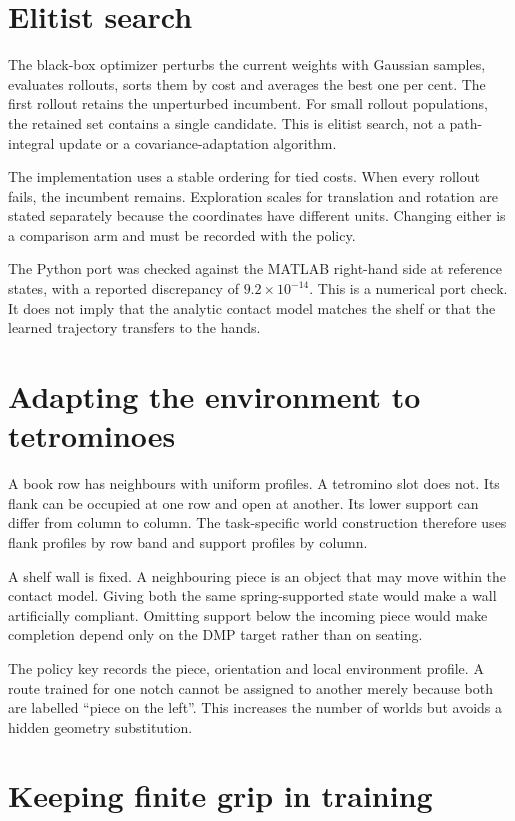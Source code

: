 \section{Elitist search}

The black-box optimizer perturbs the current weights with Gaussian samples, evaluates rollouts, sorts them by cost and averages the best one per cent. The first rollout retains the unperturbed incumbent. For small rollout populations, the retained set contains a single candidate. This is elitist search, not a path-integral update or a covariance-adaptation algorithm.

The implementation uses a stable ordering for tied costs. When every rollout fails, the incumbent remains. Exploration scales for translation and rotation are stated separately because the coordinates have different units. Changing either is a comparison arm and must be recorded with the policy.

The Python port was checked against the MATLAB right-hand side at reference states, with a reported discrepancy of $9.2\times10^{-14}$. This is a numerical port check. It does not imply that the analytic contact model matches the shelf or that the learned trajectory transfers to the hands.

\section{Adapting the environment to tetrominoes}

A book row has neighbours with uniform profiles. A tetromino slot does not. Its flank can be occupied at one row and open at another. Its lower support can differ from column to column. The task-specific world construction therefore uses flank profiles by row band and support profiles by column.

A shelf wall is fixed. A neighbouring piece is an object that may move within the contact model. Giving both the same spring-supported state would make a wall artificially compliant. Omitting support below the incoming piece would make completion depend only on the DMP target rather than on seating.

The policy key records the piece, orientation and local environment profile. A route trained for one notch cannot be assigned to another merely because both are labelled ``piece on the left''. This increases the number of worlds but avoids a hidden geometry substitution.

\section{Keeping finite grip in training}


